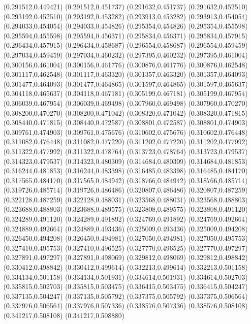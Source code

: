 (0.291512,0.449421)
(0.291512,0.451737)
(0.291632,0.451737)
(0.291632,0.452510)
(0.293192,0.452510)
(0.293192,0.453282)
(0.293913,0.453282)
(0.293913,0.454054)
(0.294033,0.454054)
(0.294033,0.454826)
(0.295354,0.454826)
(0.295354,0.455598)
(0.295594,0.455598)
(0.295594,0.456371)
(0.295834,0.456371)
(0.295834,0.457915)
(0.296434,0.457915)
(0.296434,0.458687)
(0.296554,0.458687)
(0.296554,0.459459)
(0.297034,0.459459)
(0.297034,0.460232)
(0.297395,0.460232)
(0.297395,0.461004)
(0.300156,0.461004)
(0.300156,0.461776)
(0.300876,0.461776)
(0.300876,0.462548)
(0.301117,0.462548)
(0.301117,0.463320)
(0.301357,0.463320)
(0.301357,0.464093)
(0.301477,0.464093)
(0.301477,0.464865)
(0.301597,0.464865)
(0.301597,0.465637)
(0.304118,0.465637)
(0.304118,0.467181)
(0.305199,0.467181)
(0.305199,0.467954)
(0.306039,0.467954)
(0.306039,0.469498)
(0.307960,0.469498)
(0.307960,0.470270)
(0.308200,0.470270)
(0.308200,0.471042)
(0.308320,0.471042)
(0.308320,0.471815)
(0.308440,0.471815)
(0.308440,0.472587)
(0.308801,0.472587)
(0.308801,0.474903)
(0.309761,0.474903)
(0.309761,0.475676)
(0.310602,0.475676)
(0.310602,0.476448)
(0.311082,0.476448)
(0.311082,0.477220)
(0.311202,0.477220)
(0.311202,0.477992)
(0.311322,0.477992)
(0.311322,0.478764)
(0.313723,0.478764)
(0.313723,0.479537)
(0.314323,0.479537)
(0.314323,0.480309)
(0.314684,0.480309)
(0.314684,0.481853)
(0.316244,0.481853)
(0.316244,0.483398)
(0.316485,0.483398)
(0.316485,0.484170)
(0.317565,0.484170)
(0.317565,0.484942)
(0.318766,0.484942)
(0.318766,0.485714)
(0.319726,0.485714)
(0.319726,0.486486)
(0.320807,0.486486)
(0.320807,0.487259)
(0.322128,0.487259)
(0.322128,0.488031)
(0.323568,0.488031)
(0.323568,0.488803)
(0.323688,0.488803)
(0.323688,0.489575)
(0.323808,0.489575)
(0.323808,0.491120)
(0.324289,0.491120)
(0.324289,0.491892)
(0.324769,0.491892)
(0.324769,0.492664)
(0.324889,0.492664)
(0.324889,0.493436)
(0.325009,0.493436)
(0.325009,0.494208)
(0.326450,0.494208)
(0.326450,0.494981)
(0.327050,0.494981)
(0.327050,0.495753)
(0.327410,0.495753)
(0.327410,0.496525)
(0.327770,0.496525)
(0.327770,0.497297)
(0.327891,0.497297)
(0.327891,0.498069)
(0.329812,0.498069)
(0.329812,0.498842)
(0.330412,0.498842)
(0.330412,0.499614)
(0.332213,0.499614)
(0.332213,0.501158)
(0.334134,0.501158)
(0.334134,0.501931)
(0.334614,0.501931)
(0.334614,0.502703)
(0.335815,0.502703)
(0.335815,0.503475)
(0.336415,0.503475)
(0.336415,0.504247)
(0.337135,0.504247)
(0.337135,0.505792)
(0.337375,0.505792)
(0.337375,0.506564)
(0.337976,0.506564)
(0.337976,0.507336)
(0.338576,0.507336)
(0.338576,0.508108)
(0.341217,0.508108)
(0.341217,0.508880)
